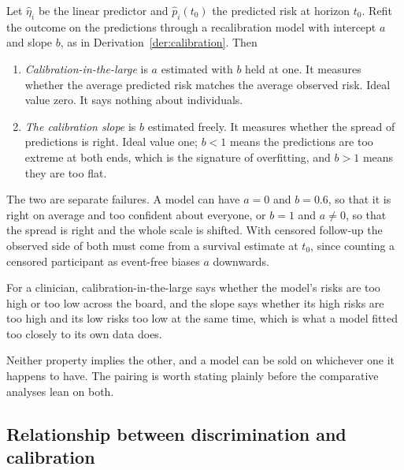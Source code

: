 \begin{definition}
\label{def:prog2:calibration}
Let $\widehat\eta_i$ be the linear predictor and $\widehat p_i(t_0)$ the
predicted risk at horizon $t_0$. Refit the outcome on the predictions through
a recalibration model with intercept $a$ and slope $b$, as in
Derivation~\ref{der:calibration}. Then
\begin{enumerate}
  \item \emph{Calibration-in-the-large} is $a$ estimated with $b$ held at one.
        It measures whether the average predicted risk matches the average
        observed risk. Ideal value zero. It says nothing about individuals.
  \item \emph{The calibration slope} is $b$ estimated freely. It measures
        whether the spread of predictions is right. Ideal value one; $b<1$
        means the predictions are too extreme at both ends, which is the
        signature of overfitting, and $b>1$ means they are too flat.
\end{enumerate}
The two are separate failures. A model can have $a=0$ and $b=0.6$, so that it
is right on average and too confident about everyone, or $b=1$ and $a\ne0$, so
that the spread is right and the whole scale is shifted. With censored
follow-up the observed side of both must come from a survival estimate at
$t_0$, since counting a censored participant as event-free biases $a$ downwards.
\end{definition}

\noindent For a clinician, calibration-in-the-large says whether the model's risks are too high or too low across the board, and the slope says whether its high risks are too high and its low risks too low at the same time, which is what a model fitted too closely to its own data does.

\medskip
{}

\medskip
\noindent Neither property implies the other, and a model can be sold on whichever one it happens to have. The pairing is worth stating plainly before the comparative analyses lean on both.

\subsection{Relationship between discrimination and calibration}
\label{sec:prog-disccal}

